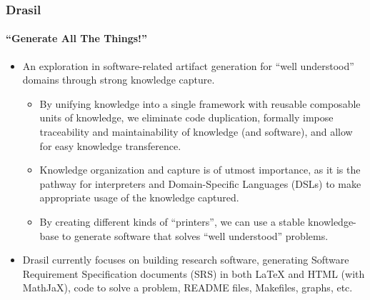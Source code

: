 \documentclass{beamer}
\begin{document}
\begin{frame}
\end{frame}

\begin{frame}
    \frametitle{Drasil}
    \framesubtitle{``Generate All The Things!''}
    
    \begin{itemize}
        \item<2-> An exploration in software-related artifact generation for ``well understood'' domains \cite{KnowledgeCapture2021} through strong knowledge capture.
            \begin{itemize}
                \item<3-> By unifying knowledge into a single framework with reusable composable units of knowledge, we eliminate code duplication, formally impose traceability and maintainability of knowledge (and software), and allow for easy knowledge transference.
                \item<4-> Knowledge organization and capture is of utmost importance, as it is the pathway for interpreters and Domain-Specific Languages (DSLs) to make appropriate usage of the knowledge captured.
                \item<5-> By creating different kinds of ``printers'', we can use a stable knowledge-base to generate software that solves ``well understood'' problems.
            \end{itemize}
        \item<6-> Drasil currently focuses on building research software, generating Software Requirement Specification documents (SRS) in both LaTeX and HTML (with MathJaX), code to solve a problem, README files, Makefiles, graphs, etc.
    \end{itemize}
\end{frame}
\end{document}
